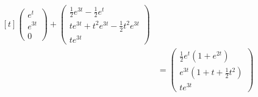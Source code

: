 \documentclass[11pt]{report}
\begin{document}
\[\begin{aligned}[t]
\begin{pmatrix}
    e^t\\
    e^{3t} \\
    0
\end{pmatrix}+\begin{pmatrix}
    \frac{1}{2}e^{3t}-\frac{1}{2}e^t \\
    te^{3t}+t^2e^{3t}-\frac{1}{2}t^2e^{3t} \\
    te^{3t}
\end{pmatrix}\\
&=\begin{pmatrix}
    \frac{1}{2}e^t(1+e^{2t}) \\
    e^{3t}(1+t+\frac{1}{2}t^2)\\
    te^{3t}
\end{pmatrix}
\end{aligned}
\]
\end{document}

